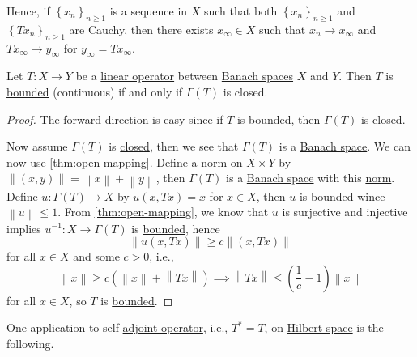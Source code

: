 Hence, if \(\left\{ x_n \right\} _{n\geq 1}\) is a sequence in \(X\) such that both \(\left\{ x_n \right\} _{n\geq 1}\) and \(\left\{ Tx_n \right\}_{n\geq 1} \) are Cauchy, then there exists \(x_\infty \in X\) such that \(x_n \to x_\infty \) and \(Tx_\infty \to y_\infty \) for \(y_\infty = Tx_\infty \).

\begin{proposition}\label{prop:closed-graph}
	Let \(T\colon X\to Y\) be a \hyperref[def:linear-op]{linear operator} between \hyperref[def:Banach-space]{Banach spaces} \(X\) and \(Y\). Then \(T\) is \hyperref[rmk:bounded-op]{bounded} (continuous) if and only if \(\Gamma (T)\) is closed.
\end{proposition}
\begin{proof}
	The forward direction is easy since if \(T\) is \hyperref[rmk:bounded-op]{bounded}, then \(\Gamma (T)\) is \hyperref[def:closed-graph]{closed}.

	Now assume \(\Gamma (T)\) is \hyperref[def:closed-graph]{closed}, then we see that \(\Gamma (T)\) is a \hyperref[def:Banach-space]{Banach space}. We can now use \autoref{thm:open-mapping}. Define a \hyperref[def:norm]{norm} on \(X \times Y\) by \(\left\lVert (x, y)\right\rVert = \left\lVert x\right\rVert + \left\lVert y\right\rVert\), then \(\Gamma (T)\) is a \hyperref[def:Banach-space]{Banach space} with this \hyperref[def:norm]{norm}. Define \(u\colon \Gamma (T)\to X\) by \(u(x, Tx)=x\) for \(x\in X\), then \(u\) is \hyperref[rmk:bounded-op]{bounded} wince \(\left\lVert u\right\rVert \leq 1\). From \autoref{thm:open-mapping}, we know that \(u\) is surjective and injective implies \(u^{-1} \colon X\to \Gamma (T)\) is \hyperref[rmk:bounded-op]{bounded}, hence
	\[
		\left\lVert u(x, Tx)\right\rVert \geq c \left\lVert (x, Tx)\right\rVert
	\]
	for all \(x\in X\) and some \(c> 0\), i.e.,
	\[
		\left\lVert x\right\rVert \geq c \left( \left\lVert x\right\rVert + \left\lVert Tx\right\rVert  \right) \implies \left\lVert Tx\right\rVert \leq \left( \frac{1}{c}- 1 \right) \left\lVert x\right\rVert
	\]
	for all \(x\in X\), so \(T\) is \hyperref[rmk:bounded-op]{bounded}.
\end{proof}

One application to self-\hyperref[def:adjoint-op]{adjoint operator}, i.e., \(T^{\ast} = T\), on \hyperref[def:Hilbert-space]{Hilbert space} is the following.

